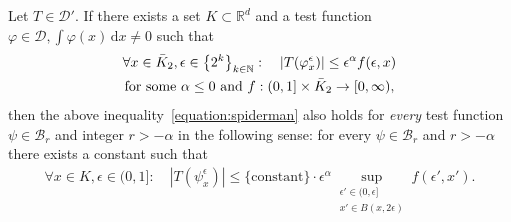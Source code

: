 \begin{theorem}\label{proposition:spiderman}
  Let \( T \in \mathcal{D}' \). If there exists a set \( K \subset \mathbb{R}^d \) and a test function \( \varphi \in \mathcal{D}, \int \varphi(x) \, \mathrm{d}x \neq 0 \) such that 
  \begin{gather}\label{equation:spiderman}
    \forall x \in \bar{K}_{2}, \epsilon \in \left\{ 2^{k} \right\}_{k \in \mathbb{N}}: \quad |T(\varphi^\epsilon_x)| \leq \epsilon^\alpha f(\epsilon, x) \\
    \text{for some \( \alpha \leq 0 \) and \( f: (0,1] \times \bar{K}_{2} \to [0, \infty) \)}, \nonumber
  \end{gather}
  then the above inequality~\eqref{equation:spiderman} also holds for \emph{every} test function \( \psi \in \mathcal{B}_r \) and integer \( r > -\alpha \) in the following sense: for every \( \psi \in \mathcal{B}_r \) and \(r > -\alpha\) there exists a constant such that
  \begin{align*}
    \forall x \in K, \epsilon \in (0,1]: \quad |T(\psi^\epsilon_x)| \leq \{ \mathrm{constant} \} \cdot \epsilon^\alpha \sup_{\substack{\epsilon' \in (0, \epsilon]\\x' \in B(x, 2\epsilon)}} f(\epsilon', x').
  \end{align*}
\end{theorem}

